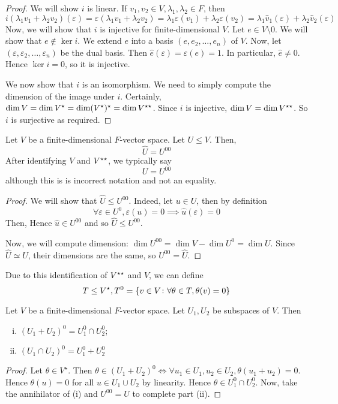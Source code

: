 \begin{proof}
	We will show \( i \) is linear.
	If \( v_1, v_2 \in V, \lambda_1, \lambda_2 \in F \), then
	\[
		i(\lambda_1 v_1 + \lambda_2 v_2) (\varepsilon) = \varepsilon(\lambda_1 v_1 + \lambda_2 v_2) = \lambda_1 \varepsilon(v_1) + \lambda_2 \varepsilon(v_2) = \lambda_1 \hat v_1(\varepsilon) + \lambda_2 \hat v_2(\varepsilon)
	\]
	Now, we will show that \( i \) is injective for finite-dimensional \( V \).
	Let \( e \in V \setminus \qty{0} \).
	We will show that \( e \not\in \ker i \).
	We extend \( e \) into a basis \( (e, e_2, \dots, e_n) \) of \( V \).
	Now, let \( (\varepsilon, \varepsilon_2, \dots, \varepsilon_n) \) be the dual basis.
	Then \( \hat e(\varepsilon) = \varepsilon(e) = 1 \).
	In particular, \( \hat e \neq 0 \).
	Hence \( \ker i = \qty{0} \), so it is injective.

	We now show that \( i \) is an isomorphism.
	We need to simply compute the dimension of the image under \( i \).
	Certainly, \( \dim V = \dim V^\star = \dim (V^\star)^\star = \dim V^{\star\star} \).
	Since \( i \) is injective, \( \dim V = \dim V^{\star\star} \).
	So \( i \) is surjective as required.
\end{proof}
\begin{lemma}
	Let \( V \) be a finite-dimensional \( F \)-vector space.
	Let \( U \leq V \).
	Then,
	\[
		\hat U = U^{00}
	\]
	After identifying \( V \) and \( V^{\star\star} \), we typically say
	\[
		U = U^{00}
	\]
	although this is is incorrect notation and not an equality.
\end{lemma}
\begin{proof}
	We will show that \( \hat U \leq U^{00} \).
	Indeed, let \( u \in U \), then by definition
	\[
		\forall \varepsilon \in U^0, \varepsilon(u) = 0 \implies \hat u(\varepsilon) = 0
	\]
	Then,
	Hence \( \hat u \in U^{00} \) and so \( \hat U \leq U^{00} \).

	Now, we will compute dimension:	\( \dim U^{00} = \dim V - \dim U^0 = \dim U \).
	Since \( \hat U \simeq U \), their dimensions are the same, so \( U^{00} = \hat U \).
\end{proof}
\begin{remark}
	Due to this identification of \( V^{\star\star} \) and \( V \), we can define
	\[
		T \leq V^\star, T^0 = \qty{v \in V \colon \forall \theta \in T, \theta(v) = 0}
	\]
\end{remark}
\begin{lemma}
	Let \( V \) be a finite-dimensional \( F \)-vector space.
	Let \( U_1, U_2 \) be subspaces of \( V \).
	Then
	\begin{enumerate}[(i)]
		\item \( (U_1 + U_2)^0 = U_1^0 \cap U_2^0 \);
		\item \( (U_1 \cap U_2)^0 = U_1^0 + U_2^0 \)
	\end{enumerate}
\end{lemma}
\begin{proof}
	Let \( \theta \in V^\star \).
	Then \( \theta \in (U_1 + U_2)^0 \iff \forall u_1 \in U_1, u_2 \in U_2, \theta(u_1 + u_2) = 0 \).
	Hence \( \theta(u) = 0 \) for all \( u \in U_1 \cup U_2 \) by linearity.
	Hence \( \theta \in U_1^0 \cap U_2^0 \).
	Now, take the annihilator of (i) and \( U^{00} = U \) to complete part (ii).
\end{proof}
